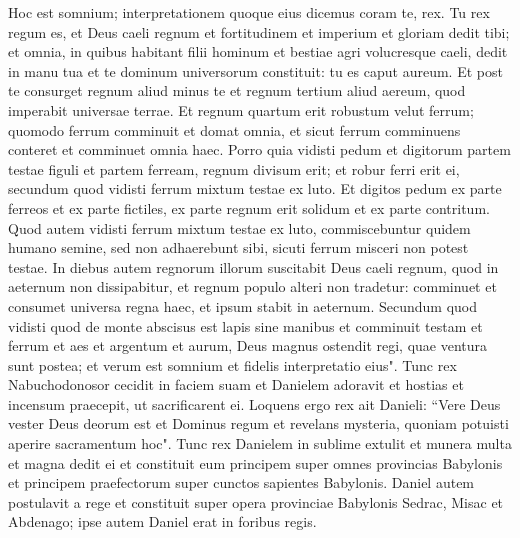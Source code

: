 \begin{biblechapter}
\verse Hoc est somnium; interpretationem quoque eius dicemus coram te, rex. 
\verse Tu rex regum es, et Deus caeli regnum et fortitudinem et imperium et gloriam dedit tibi; 
\verse et omnia, in quibus habitant filii hominum et bestiae agri volucresque caeli, dedit in manu tua et te dominum universorum constituit: tu es caput aureum. 
\verse Et post te consurget regnum aliud minus te et regnum tertium aliud aereum, quod imperabit universae terrae. 
\verse Et regnum quartum erit robustum velut ferrum; quomodo ferrum comminuit et domat omnia, et sicut ferrum comminuens conteret et comminuet omnia haec. 
\verse Porro quia vidisti pedum et digitorum partem testae figuli et partem ferream, regnum divisum erit; et robur ferri erit ei, secundum quod vidisti ferrum mixtum testae ex luto.  
\verse Et digitos pedum ex parte ferreos et ex parte fictiles, ex parte regnum erit solidum et ex parte contritum. 
\verse Quod autem vidisti ferrum mixtum testae ex luto, commiscebuntur quidem humano semine, sed non adhaerebunt sibi, sicuti ferrum misceri non potest testae. 
\verse In diebus autem regnorum illorum suscitabit Deus caeli regnum, quod in aeternum non dissipabitur, et regnum populo alteri non tradetur: comminuet et consumet universa regna haec, et ipsum stabit in aeternum. 
\verse Secundum quod vidisti quod de monte abscisus est lapis sine manibus et comminuit testam et ferrum et aes et argentum et aurum, Deus magnus ostendit regi, quae ventura sunt postea; et verum est somnium et fidelis interpretatio eius". 
\verse Tunc rex Nabuchodonosor cecidit in faciem suam et Danielem adoravit et hostias et incensum praecepit, ut sacrificarent ei. 
\verse Loquens ergo rex ait Danieli: “Vere Deus vester Deus deorum est et Dominus regum et revelans mysteria, quoniam potuisti aperire sacramentum hoc". 
\verse Tunc rex Danielem in sublime extulit et munera multa et magna dedit ei et constituit eum principem super omnes provincias Babylonis et principem praefectorum super cunctos sapientes Babylonis. 
\verse Daniel autem postulavit a rege et constituit super opera provinciae Babylonis Sedrac, Misac et Abdenago; ipse autem Daniel erat in foribus regis. 
\end{biblechapter}

